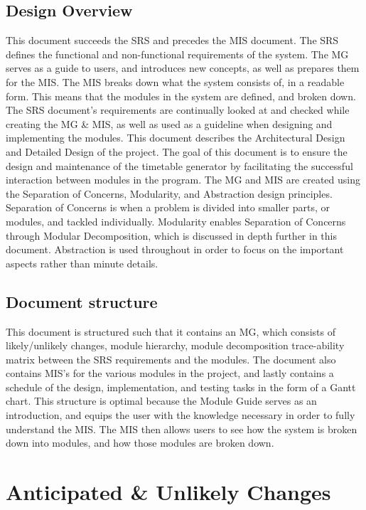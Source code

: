 \documentclass[11pt, oneside]{article}
\begin{document}
\subsection{Design Overview}
\tab This document succeeds the SRS and precedes the MIS document. The SRS defines the functional and non-functional requirements of the system. The MG serves as a guide to users, and introduces new concepts, as well as prepares them for the MIS. The MIS breaks down what the system consists of, in a readable form. This means that the modules in the system are defined, and broken down. The SRS document's requirements are continually looked at and checked while creating the MG \& MIS, as well as used as a guideline when designing and implementing the modules. This document describes the Architectural Design and Detailed Design of the project. The goal of this document is to ensure the design and maintenance of the timetable generator by facilitating the successful interaction between modules in the program. The MG and MIS are created using the Separation of Concerns, Modularity, and Abstraction design principles. Separation of Concerns is when a problem is divided into smaller parts, or modules, and tackled individually. Modularity enables Separation of Concerns through Modular Decomposition, which is discussed in depth further in this document. Abstraction is used throughout in order to focus on the important aspects rather than minute details. 

\subsection{Document structure}
\tab This document is structured such that it contains an MG, which consists of likely/unlikely changes, module hierarchy, module decomposition trace-ability matrix between the SRS requirements and the modules. The document also contains MIS's for the various modules in the project, and lastly contains a schedule of the design, implementation, and testing tasks in the form of a Gantt chart. This structure is optimal because the Module Guide serves as an introduction, and equips the user with the knowledge necessary in order to fully understand the MIS. The MIS then allows users to see how the system is broken down into modules, and how those modules are broken down.

\newpage
\section{Anticipated \& Unlikely Changes}
\end{document}
